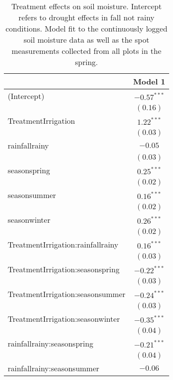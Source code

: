 
\begin{table}
\caption{Treatment effects on soil moisture. Intercept refers to drought effects in fall not rainy conditions.  Model fit to the continuously logged soil moisture data as well as the spot measurements collected from all plots in the spring.}
\begin{center}
\begin{tabular}{l c }
\hline
 & Model 1 \\
\hline
(Intercept)                       & $-0.57^{***}$ \\
                                  & $(0.16)$      \\
TreatmentIrrigation               & $1.22^{***}$  \\
                                  & $(0.03)$      \\
rainfallrainy                     & $-0.05$       \\
                                  & $(0.03)$      \\
seasonspring                      & $0.25^{***}$  \\
                                  & $(0.02)$      \\
seasonsummer                      & $0.16^{***}$  \\
                                  & $(0.02)$      \\
seasonwinter                      & $0.26^{***}$  \\
                                  & $(0.02)$      \\
TreatmentIrrigation:rainfallrainy & $0.16^{***}$  \\
                                  & $(0.03)$      \\
TreatmentIrrigation:seasonspring  & $-0.22^{***}$ \\
                                  & $(0.03)$      \\
TreatmentIrrigation:seasonsummer  & $-0.24^{***}$ \\
                                  & $(0.03)$      \\
TreatmentIrrigation:seasonwinter  & $-0.35^{***}$ \\
                                  & $(0.04)$      \\
rainfallrainy:seasonspring        & $-0.21^{***}$ \\
                                  & $(0.04)$      \\
rainfallrainy:seasonsummer        & $-0.06$       \\

\end{tabular}
\end{center}
\end{table}
